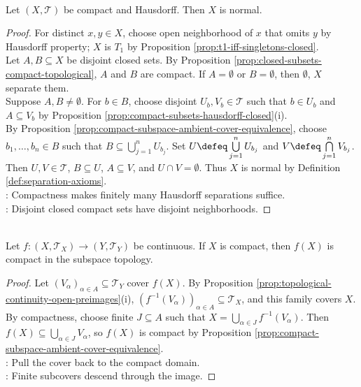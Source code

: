 \begin{theorem} \label{thm:compact-hausdorff-normal} \\
Let $(X,\mathcal{T})$ be compact and Hausdorff. Then $X$ is normal.
\begin{proof}
For distinct $x,y\in X$, choose open neighborhood of $x$ that omits $y$ by Hausdorff property; $X$ is $T_1$ by Proposition \ref{prop:t1-iff-singletons-closed}.\\
Let $A,B\subseteq X$ be disjoint closed sets. By Proposition \ref{prop:closed-subsets-compact-topological}, $A$ and $B$ are compact. If $A=\emptyset$ or $B=\emptyset$, then $\emptyset$, $X$ separate them.\\
Suppose $A,B\neq\emptyset$. For $b\in B$, choose disjoint $U_b,V_b\in\mathcal{T}$ such that $b\in U_b$ and $A\subseteq V_b$ by Proposition \ref{prop:compact-subsets-hausdorff-closed}(i).\\
By Proposition \ref{prop:compact-subspace-ambient-cover-equivalence}, choose $b_1,\ldots,b_n\in B$ such that $B\subseteq\bigcup\limits_{j=1}^nU_{b_j}$. Set $U\defeq\bigcup\limits_{j=1}^nU_{b_j}$ and $V\defeq\bigcap\limits_{j=1}^nV_{b_j}$.\\
Then $U,V\in\mathcal{T}$, $B\subseteq U$, $A\subseteq V$, and $U\cap V=\emptyset$. Thus $X$ is normal by Definition \ref{def:separation-axioms}.\\
: Compactness makes finitely many Hausdorff separations suffice.\\
: Disjoint closed compact sets have disjoint neighborhoods.
\end{proof}
\end{theorem}

\begin{theorem} \label{thm:continuous-image-compact-topological} \\
Let $f:(X,\mathcal{T}_X)\to(Y,\mathcal{T}_Y)$ be continuous. If $X$ is compact, then $f(X)$ is compact in the subspace topology.
\begin{proof}
Let $(V_\alpha)_{\alpha\in A}\subseteq\mathcal{T}_Y$ cover $f(X)$. By Proposition \ref{prop:topological-continuity-open-preimages}(i), $(f^{-1}(V_\alpha))_{\alpha\in A}\subseteq\mathcal{T}_X$, and this family covers $X$.\\
By compactness, choose finite $J\subseteq A$ such that $X=\bigcup\limits_{\alpha\in J}f^{-1}(V_\alpha)$. Then $f(X)\subseteq\bigcup_{\alpha\in J}V_\alpha$, so $f(X)$ is compact by Proposition \ref{prop:compact-subspace-ambient-cover-equivalence}.\\
: Pull the cover back to the compact domain.\\
: Finite subcovers descend through the image.
\end{proof}
\end{theorem}

